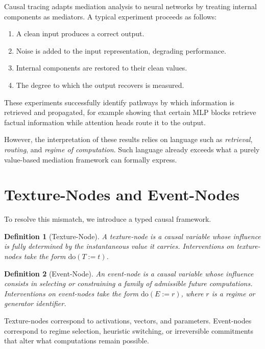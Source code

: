 \documentclass[11pt]{article}
\newtheorem{definition}{Definition}
\newcommand{\doop}{\mathrm{do}}
\begin{document}
Causal tracing adapts mediation analysis to neural networks by treating internal components as mediators. A typical experiment proceeds as follows:

\begin{enumerate}
\item A clean input produces a correct output.
\item Noise is added to the input representation, degrading performance.
\item Internal components are restored to their clean values.
\item The degree to which the output recovers is measured.
\end{enumerate}

These experiments successfully identify pathways by which information is retrieved and propagated, for example showing that certain MLP blocks retrieve factual information while attention heads route it to the output.

However, the interpretation of these results relies on language such as \emph{retrieval}, \emph{routing}, and \emph{regime of computation}. Such language already exceeds what a purely value-based mediation framework can formally express.

\section{Texture-Nodes and Event-Nodes}

To resolve this mismatch, we introduce a typed causal framework.

\begin{definition}[Texture-Node]
A \emph{texture-node} is a causal variable whose influence is fully determined by the instantaneous value it carries. Interventions on texture-nodes take the form \( \doop(T := t) \).
\end{definition}

\begin{definition}[Event-Node]
An \emph{event-node} is a causal variable whose influence consists in selecting or constraining a family of admissible future computations. Interventions on event-nodes take the form \( \doop(E := r) \), where \(r\) is a regime or generator identifier.
\end{definition}

Texture-nodes correspond to activations, vectors, and parameters. Event-nodes correspond to regime selection, heuristic switching, or irreversible commitments that alter what computations remain possible.
\end{document}
